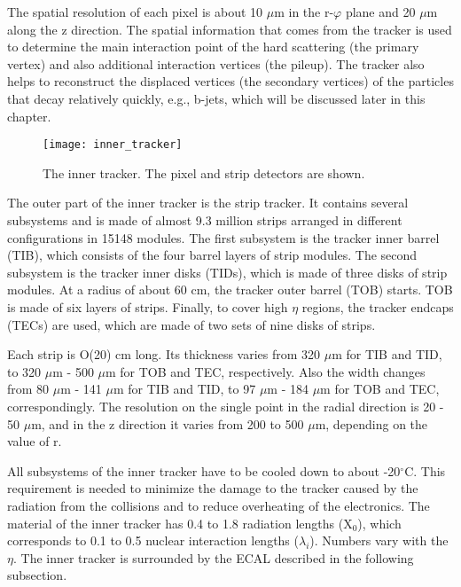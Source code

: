 \begin{normalsize}
The spatial resolution of each pixel is about 10 $\mu$m in the r-$\varphi$ plane and 20 $\mu$m along the z direction. The spatial information that comes from the tracker is used to determine the main interaction point of the hard scattering (the primary vertex) and also additional interaction vertices (the pileup). The tracker also helps to reconstruct the displaced vertices (the secondary vertices) of the particles that decay relatively quickly, e.g., b-jets, which will be discussed later in this chapter. 




\begin{figure}[h!]
  \centering
  \texttt{[image: inner\_tracker]}
  \caption[The inner tracker]{The inner tracker. The pixel and strip detectors are shown. }
  \label{inner_tracker}
\end{figure}


The outer part of the inner tracker is the strip tracker. It contains several subsystems and is made of almost 9.3 million strips arranged in different configurations in 15148 modules. The first subsystem is the tracker inner barrel (TIB), which consists of the four barrel layers of strip modules. The second subsystem is the tracker inner disks (TIDs), which is made of three disks of strip modules. At a radius of about 60 cm, the tracker outer barrel (TOB) starts. TOB is made of six layers of strips. Finally, to cover high $\eta$ regions, the tracker endcaps (TECs) are used, which are made of two sets of nine disks of strips. 

Each strip is O(20) cm long. Its thickness varies from 320 $\mu$m  for TIB and TID, to 320 $\mu$m - 500 $\mu$m  for TOB and TEC, respectively. Also the width changes from 80 $\mu$m - 141 $\mu$m for TIB and TID, to 97 $\mu$m - 184 $\mu$m  for TOB and TEC, correspondingly. The resolution on the single point in the radial direction is 20 - 50 $\mu$m, and in the z direction it varies from 200 to 500 $\mu$m, depending on the value of r. 

All subsystems of the inner tracker have to be cooled down to about -20$^{\circ}$C.  This requirement is needed to minimize the damage to the tracker caused by the radiation from the collisions and to reduce overheating of the electronics. The material of the inner tracker has 0.4 to 1.8 radiation lengths (X$_0$), which corresponds to 0.1 to 0.5 nuclear interaction lengths ($\lambda_i $). Numbers vary with the $\eta$. The inner tracker is surrounded by the ECAL described in the following subsection.





\end{normalsize}
